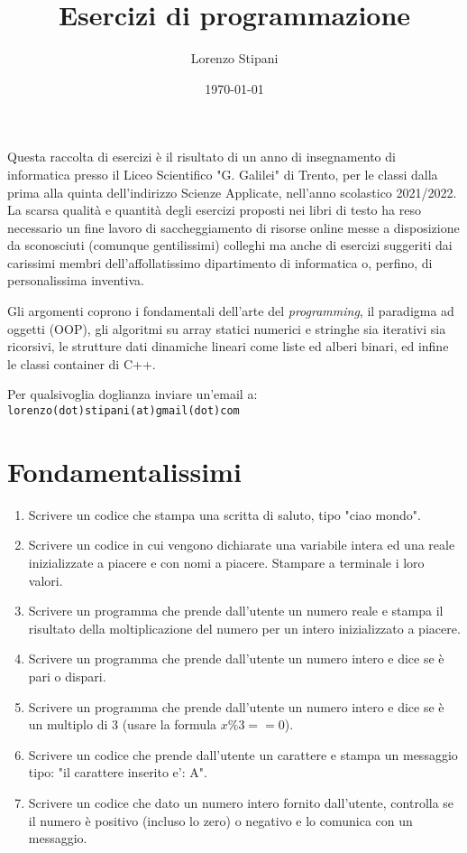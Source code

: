 \documentclass{article}
\title{Esercizi di programmazione}
\date{\today}
\author{Lorenzo Stipani}
\begin{document}
\maketitle

Questa raccolta di esercizi è il risultato di un anno di insegnamento di informatica presso il Liceo Scientifico "G. Galilei" di Trento, per le classi dalla prima alla quinta dell'indirizzo Scienze Applicate, nell'anno scolastico 2021/2022. La scarsa qualità e quantità degli esercizi proposti nei libri di testo ha reso necessario un fine lavoro di saccheggiamento di risorse online messe a disposizione da sconosciuti (comunque gentilissimi) colleghi ma anche di esercizi suggeriti dai carissimi membri dell'affollatissimo dipartimento di informatica o, perfino, di personalissima inventiva.

Gli argomenti coprono i fondamentali dell'arte del \emph{programming}, il paradigma ad oggetti (OOP), gli algoritmi su array statici numerici e stringhe sia iterativi sia ricorsivi, le strutture dati dinamiche lineari come liste ed alberi binari, ed infine le classi container di C++.

Per qualsivoglia doglianza inviare un'email a: \texttt{lorenzo(dot)stipani(at)gmail(dot)com}

\section{Fondamentalissimi}
\begin{enumerate}

\item Scrivere un codice che stampa una scritta di saluto, tipo "ciao mondo".

\item Scrivere un codice in cui vengono dichiarate una variabile intera ed una reale inizializzate a piacere e con nomi a piacere. Stampare a terminale i loro valori.

\item Scrivere un programma che prende dall'utente un numero reale e stampa il risultato della moltiplicazione del numero per un intero inizializzato a piacere.

\item Scrivere un programma che prende dall'utente un numero intero e dice se è pari o dispari.

\item Scrivere un programma che prende dall'utente un numero intero e dice se è un multiplo di 3 (usare la formula $x\%3 == 0$).

\item Scrivere un codice che prende dall'utente un carattere e stampa un messaggio tipo: "il carattere inserito e': A".

\item Scrivere un codice che dato un numero intero fornito dall'utente, controlla se il numero è positivo (incluso lo zero) o negativo e lo comunica con un messaggio.
\end{enumerate}
\end{document}
